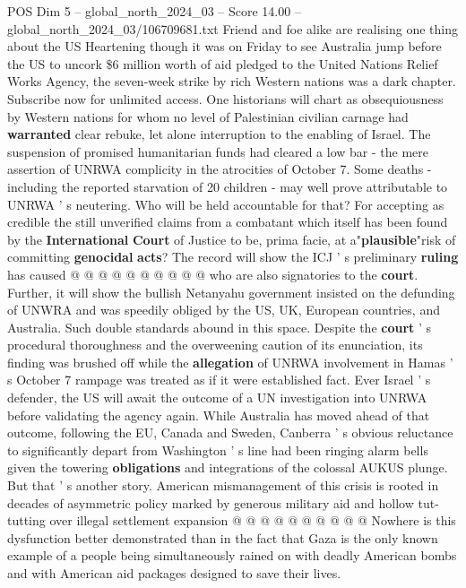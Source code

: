 \begin{textsample}{POS Dim 5 – global\_north\_2024\_03 – Score 14.00 – global\_north\_2024\_03/106709681.txt}  \label{ex:f5_pos_295}
Friend and foe alike are realising one thing about the US Heartening though it was on Friday to see Australia jump before the US to uncork \$6 million worth of aid pledged to the United Nations Relief Works Agency, the seven-week strike by rich Western nations was a dark chapter.
Subscribe now for unlimited access.
One historians will chart as obsequiousness by Western nations for whom no level of Palestinian civilian carnage had \textbf{warranted} clear rebuke, let alone interruption to the enabling of Israel.
The suspension of promised humanitarian funds had cleared a low bar - the mere assertion of UNRWA complicity in the atrocities of October 7.
Some deaths - including the reported starvation of 20 children - may well prove attributable to UNRWA ' s neutering.
Who will be held accountable for that?
For accepting as credible the still unverified claims from a combatant which itself has been found by the \textbf{International} \textbf{Court} of Justice to be, prima facie, at a"\textbf{plausible}"risk of committing \textbf{genocidal} \textbf{acts}?
The record will show the ICJ ' s preliminary \textbf{ruling} has caused @ @ @ @ @ @ @ @ @ @ who are also signatories to the \textbf{court}.
Further, it will show the bullish Netanyahu government insisted on the defunding of UNWRA and was speedily obliged by the US, UK, European countries, and Australia.
Such double standards abound in this space.
Despite the \textbf{court} ' s procedural thoroughness and the overweening caution of its enunciation, its finding was brushed off while the \textbf{allegation} of UNRWA involvement in Hamas ' s October 7 rampage was treated as if it were established fact.
Ever Israel ' s defender, the US will await the outcome of a UN investigation into UNRWA before validating the agency again.
While Australia has moved ahead of that outcome, following the EU, Canada and Sweden, Canberra ' s obvious reluctance to significantly depart from Washington ' s line had been ringing alarm bells given the towering \textbf{obligations} and integrations of the colossal AUKUS plunge.
But that ' s another story.
American mismanagement of this crisis is rooted in decades of asymmetric policy marked by generous military aid and hollow tut-tutting over illegal settlement expansion @ @ @ @ @ @ @ @ @ @ Nowhere is this dysfunction better demonstrated than in the fact that Gaza is the only known example of a people being simultaneously rained on with deadly American bombs and with American aid packages designed to save their lives.

\end{textsample}
